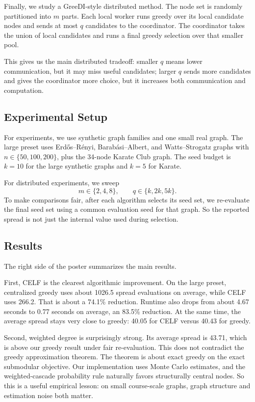 \documentclass[10pt]{article}
\begin{document}
Finally, we study a GreeDI-style distributed method. The node set is randomly
partitioned into \(m\) parts. Each local worker runs greedy over its local
candidate nodes and sends at most \(q\) candidates to the coordinator. The
coordinator takes the union of local candidates and runs a final greedy
selection over that smaller pool.

This gives us the main distributed tradeoff: smaller \(q\) means lower
communication, but it may miss useful candidates; larger \(q\) sends more
candidates and gives the coordinator more choice, but it increases both
communication and computation.

\subsection*{Experimental Setup}

For experiments, we use synthetic graph families and one small real graph. The
large preset uses Erdős--Rényi, Barabási--Albert, and Watts--Strogatz graphs
with \(n\in\{50,100,200\}\), plus the 34-node Karate Club graph. The seed
budget is \(k=10\) for the large synthetic graphs and \(k=5\) for Karate.

For distributed experiments, we sweep
\[
m\in\{2,4,8\},\qquad q\in\{k,2k,5k\}.
\]
To make comparisons fair, after each algorithm selects its seed set, we
re-evaluate the final seed set using a common evaluation seed for that graph.
So the reported spread is not just the internal value used during selection.

\subsection*{Results}

The right side of the poster summarizes the main results.

First, CELF is the clearest algorithmic improvement. On the large preset,
centralized greedy uses about 1026.5 spread evaluations on average, while CELF
uses 266.2. That is about a 74.1\% reduction. Runtime also drops from about
4.67 seconds to 0.77 seconds on average, an 83.5\% reduction. At the same time,
the average spread stays very close to greedy: 40.05 for CELF versus 40.43 for
greedy.

Second, weighted degree is surprisingly strong. Its average spread is 43.71,
which is above our greedy result under fair re-evaluation. This does not
contradict the greedy approximation theorem. The theorem is about exact greedy
on the exact submodular objective. Our implementation uses Monte Carlo
estimates, and the weighted-cascade probability rule naturally favors
structurally central nodes. So this is a useful empirical lesson: on small
course-scale graphs, graph structure and estimation noise both matter.
\end{document}
